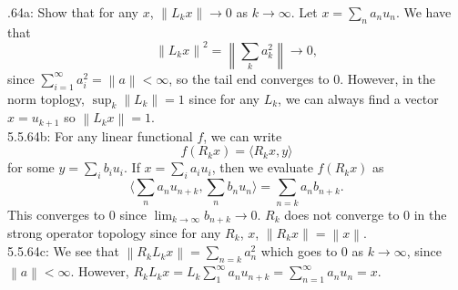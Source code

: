 \documentclass[letterpaper]{article}
\newcommand{\lan}{\langle}
\newcommand{\ran}{\rangle}
\newcommand{\norm}[1]{\left\lVert#1\right\rVert}
\newcommand{\inn}[1]{\lan#1\ran}
\begin{document}
 .64a: Show that for any $x$, $\norm{L_k x}\to 0$ as $k\to \infty$. Let $x = \sum_{n}a_n u_n$. 
We have that $$\norm{L_kx}^2 = \norm{\sum_k a_k^2} \to 0,$$ since $\sum_{i=1}^\infty a_i^2 = \norm{a}< \infty$, so the tail end converges to $0$. 
However, in the norm toplogy, $\sup_{k} \norm{L_k} =1$ since for any $L_k$, we can always find a vector $x = u_{k+1}$ so $\norm{L_k x} = 1$. 
\newline \\ 5.5.64b: For any linear functional $f$, we can write $$f(R_k x) = \inn{R_k x, y} $$ for some $y = \sum_{i}b_i u_i.$ If $x = \sum_{i}a_i u_i$, then we evaluate $f(R_kx)$ as $$\inn{\sum_{n} a_nu_{n+k}, \sum_{n} b_n u_n} = \sum_{n=k} a_n b_{n+k}.$$
This converges to $0$ since $\lim_{k\to \infty} b_{n+k} \to 0$. $R_k$ does not converge to $0$ in the strong operator topology
since for any $R_k$, $x$, $\norm{R_k x} = \norm{x}$. 
\newline \\ 5.5.64c: We see that $ \norm{R_kL_k x}= \sum_{n=k} a_{n}^2  $ which goes to $0$ as $k\to \infty$, since $\norm{a} < \infty$. 
However, $R_kL_k x= L_k \sum_{1}^\infty a_n u_{n+k} = \sum_{n=1}^\infty a_n u_n = x$.  
\end{document}
